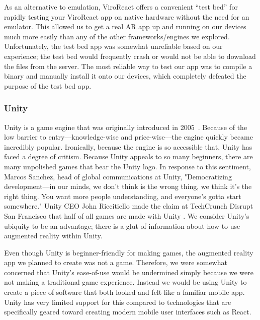 \documentclass[a4paper, 10pt, american, titlepage]{article}
\begin{document}
As an alternative to emulation, ViroReact offers a convenient ``test bed'' for
rapidly testing your ViroReact app on native hardware without the need for an
emulator. This allowed us to get a real AR app up and running on our devices
much more easily than any of the other frameworks/engines we explored.
Unfortunately, the test bed app was somewhat unreliable based on our
experience; the test bed would frequently crash or would not be able to
download the files from the server. The most reliable way to test our app was
to compile a binary and manually install it onto our devices, which completely
defeated the purpose of the test bed app.

\subsubsection{Unity}
\label{sec:unity}

Unity is a game engine that was originally introduced in
2005~\autocite{axon2016}. Because of the low barrier to entry---knowledge-wise
and price-wise---the engine quickly became incredibly popular. Ironically,
because the engine is so accessible that, Unity has faced a degree of critism.
Because Unity appeals to so many beginners, there are many unpolished games that
bear the Unity logo. In response to this sentiment, Marcos Sanchez, head of
global communications at Unity, "Democratizing development---in our minds, we
don’t think is the wrong thing, we think it’s the right thing. You want more
people understanding, and everyone’s gotta start somewhere." Unity CEO John
Riccitiello made the claim at TechCrunch Disrupt San Francisco that half of all
games are made with Unity \autocite{dillet2018}. We consider Unity's ubiquity to
be an advantage; there is a glut of information about how to use augmented
reality within Unity.

Even though Unity is beginner-friendly for making games, the augmented reality
app we planned to create was not a game. Therefore, we were somewhat concerned
that Unity's ease-of-use would be undermined simply because we were not making a
traditional game experience. Instead we would be using Unity to create a piece
of software that both looked and felt like a familiar mobile app. Unity has very
limited support for this compared to technologies that are specifically geared
toward creating modern mobile user interfaces such as React.
\end{document}
